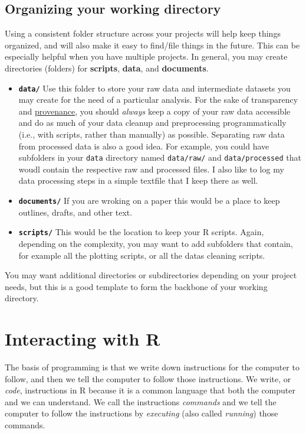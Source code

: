 \documentclass[]{book}
\providecommand{\tightlist}{%
  \setlength{\itemsep}{0pt}\setlength{\parskip}{0pt}}
\theoremstyle{definition}
\theoremstyle{definition}
\theoremstyle{definition}
\theoremstyle{remark}
\begin{document}
\subsection{Organizing your working
directory}\label{organizing-your-working-directory}

Using a consistent folder structure across your projects will help keep
things organized, and will also make it easy to find/file things in the
future. This can be especially helpful when you have multiple projects.
In general, you may create directories (folders) for \textbf{scripts},
\textbf{data}, and \textbf{documents}.

\begin{itemize}
\tightlist
\item
  \textbf{\texttt{data/}} Use this folder to store your raw data and
  intermediate datasets you may create for the need of a particular
  analysis. For the sake of transparency and
  \href{https://en.wikipedia.org/wiki/Provenance}{provenance}, you
  should \emph{always} keep a copy of your raw data accessible and do as
  much of your data cleanup and preprocessing programmatically (i.e.,
  with scripts, rather than manually) as possible. Separating raw data
  from processed data is also a good idea. For example, you could have
  subfolders in your \texttt{data} directory named \texttt{data/raw/}
  and \texttt{data/processed} that woudl contain the respective raw and
  processed files. I also like to log my data processing steps in a
  simple textfile that I keep there as well.
\item
  \textbf{\texttt{documents/}} If you are wroking on a paper this would
  be a place to keep outlines, drafts, and other text.
\item
  \textbf{\texttt{scripts/}} This would be the location to keep your R
  scripts. Again, depending on the complexity, you may want to add
  subfolders that contain, for example all the plotting scripts, or all
  the datas cleaning scripts.
\end{itemize}

You may want additional directories or subdirectories depending on your
project needs, but this is a good template to form the backbone of your
working directory.

\section{Interacting with R}\label{interacting-with-r}

The basis of programming is that we write down instructions for the
computer to follow, and then we tell the computer to follow those
instructions. We write, or \emph{code}, instructions in R because it is
a common language that both the computer and we can understand. We call
the instructions \emph{commands} and we tell the computer to follow the
instructions by \emph{executing} (also called \emph{running}) those
commands.
\end{document}
